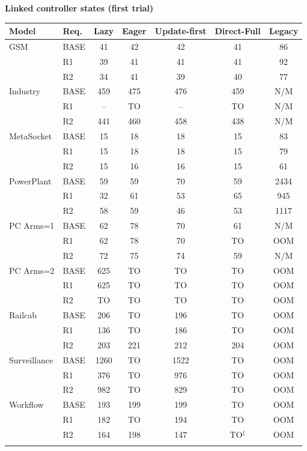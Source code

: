 \clearpage\noindent\textbf{Linked controller states (first trial)}\par\smallskip
\begingroup\scriptsize\setlength{\tabcolsep}{3pt}
\begin{tabular}{@{}llccccc@{}}
\toprule
Model & Req. & Lazy & Eager & Update-first & Direct-Full & Legacy\\
\midrule
GSM & BASE & 41 & 42 & 42 & 41 & 86\\
 & R1 & 39 & 41 & 41 & 41 & 92\\
 & R2 & 34 & 41 & 39 & 40 & 77\\
\addlinespace[2pt]
Industry & BASE & 459 & 475 & 476 & 459 & N/M\\
 & R1 & -- & TO & -- & TO & N/M\\
 & R2 & 441 & 460 & 458 & 438 & N/M\\
\addlinespace[2pt]
MetaSocket & BASE & 15 & 18 & 18 & 15 & 83\\
 & R1 & 15 & 18 & 18 & 15 & 79\\
 & R2 & 15 & 16 & 16 & 15 & 61\\
\addlinespace[2pt]
PowerPlant & BASE & 59 & 59 & 70 & 59 & 2434\\
 & R1 & 32 & 61 & 53 & 65 & 945\\
 & R2 & 58 & 59 & 46 & 53 & 1117\\
\addlinespace[2pt]
PC Arms=1 & BASE & 62 & 78 & 70 & 61 & N/M\\
 & R1 & 62 & 78 & 70 & TO & OOM\\
 & R2 & 72 & 75 & 74 & 59 & N/M\\
\addlinespace[2pt]
PC Arms=2 & BASE & 625 & TO & TO & TO & OOM\\
 & R1 & 625 & TO & TO & TO & OOM\\
 & R2 & TO & TO & TO & TO & OOM\\
\addlinespace[2pt]
Railcab & BASE & 206 & TO & 196 & TO & OOM\\
 & R1 & 136 & TO & 186 & TO & OOM\\
 & R2 & 203 & 221 & 212 & 204 & OOM\\
\addlinespace[2pt]
Surveillance & BASE & 1260 & TO & 1522 & TO & OOM\\
 & R1 & 376 & TO & 976 & TO & OOM\\
 & R2 & 982 & TO & 829 & TO & OOM\\
\addlinespace[2pt]
Workflow & BASE & 193 & 199 & 199 & TO & OOM\\
 & R1 & 182 & TO & 194 & TO & OOM\\
 & R2 & 164 & 198 & 147 & TO$^{\ddagger}$ & OOM\\
\addlinespace[2pt]
\bottomrule
\end{tabular}\endgroup

